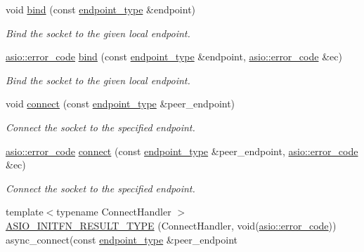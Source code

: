 \begin{DoxyCompactItemize}
void \hyperlink{classasio_1_1basic__socket_a29f2660dcb63871f6ac50e5be2545194}{bind} (const \hyperlink{classasio_1_1basic__socket_a6b2ba27d020bb24356c691f19f8d2829}{endpoint\+\_\+type} \&endpoint)
\begin{DoxyCompactList}\small\item\em Bind the socket to the given local endpoint. \end{DoxyCompactList}\item 
\hyperlink{classasio_1_1error__code}{asio\+::error\+\_\+code} \hyperlink{classasio_1_1basic__socket_a7b65419efd4f773417c53221070d5a59}{bind} (const \hyperlink{classasio_1_1basic__socket_a6b2ba27d020bb24356c691f19f8d2829}{endpoint\+\_\+type} \&endpoint, \hyperlink{classasio_1_1error__code}{asio\+::error\+\_\+code} \&ec)
\begin{DoxyCompactList}\small\item\em Bind the socket to the given local endpoint. \end{DoxyCompactList}\item 
void \hyperlink{classasio_1_1basic__socket_ac3c66c10841897d56e75799e81d7f319}{connect} (const \hyperlink{classasio_1_1basic__socket_a6b2ba27d020bb24356c691f19f8d2829}{endpoint\+\_\+type} \&peer\+\_\+endpoint)
\begin{DoxyCompactList}\small\item\em Connect the socket to the specified endpoint. \end{DoxyCompactList}\item 
\hyperlink{classasio_1_1error__code}{asio\+::error\+\_\+code} \hyperlink{classasio_1_1basic__socket_a9f590780830e8f00925fd07ebaa9e71b}{connect} (const \hyperlink{classasio_1_1basic__socket_a6b2ba27d020bb24356c691f19f8d2829}{endpoint\+\_\+type} \&peer\+\_\+endpoint, \hyperlink{classasio_1_1error__code}{asio\+::error\+\_\+code} \&ec)
\begin{DoxyCompactList}\small\item\em Connect the socket to the specified endpoint. \end{DoxyCompactList}\item 
{\footnotesize template$<$typename Connect\+Handler $>$ }\\\hyperlink{classasio_1_1basic__socket_ad9dd54f1aa4fc925712c92b3136045d4}{A\+S\+I\+O\+\_\+\+I\+N\+I\+T\+F\+N\+\_\+\+R\+E\+S\+U\+L\+T\+\_\+\+T\+Y\+P\+E} (Connect\+Handler, void(\hyperlink{classasio_1_1error__code}{asio\+::error\+\_\+code})) async\+\_\+connect(const \hyperlink{classasio_1_1basic__socket_a6b2ba27d020bb24356c691f19f8d2829}{endpoint\+\_\+type} \&peer\+\_\+endpoint

\end{DoxyCompactItemize}
